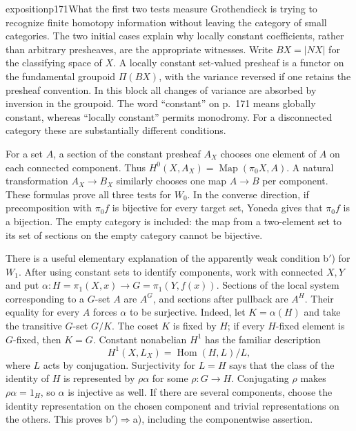 
\begin{dcomment}{exposition}{p171}{What the first two tests measure}
Grothendieck is trying to recognize finite homotopy information without leaving the category of small categories. The two initial cases explain why locally constant coefficients, rather than arbitrary presheaves, are the appropriate witnesses. Write $BX=|NX|$ for the classifying space of $X$. A locally constant set-valued presheaf is a functor on the fundamental groupoid $\Pi(BX)$, with the variance reversed if one retains the presheaf convention. In this block all changes of variance are absorbed by inversion in the groupoid. The word ``constant'' on p.~171 means globally constant, whereas ``locally constant'' permits monodromy. For a disconnected category these are substantially different conditions.

For a set $A$, a section of the constant presheaf $A_X$ chooses one element of $A$ on each connected component. Thus $H^0(X,A_X)=\operatorname{Map}(\pi_0X,A)$. A natural transformation $A_X\to B_X$ similarly chooses one map $A\to B$ per component. These formulas prove all three tests for $W_0$. In the converse direction, if precomposition with $\pi_0f$ is bijective for every target set, Yoneda gives that $\pi_0f$ is a bijection. The empty category is included: the map from a two-element set to its set of sections on the empty category cannot be bijective.

There is a useful elementary explanation of the apparently weak condition b$'$) for $W_1$. After using constant sets to identify components, work with connected $X,Y$ and put $\alpha:H=\pi_1(X,x)\to G=\pi_1(Y,f(x))$. Sections of the local system corresponding to a $G$-set $A$ are $A^G$, and sections after pullback are $A^H$. Their equality for every $A$ forces $\alpha$ to be surjective. Indeed, let $K=\alpha(H)$ and take the transitive $G$-set $G/K$. The coset $K$ is fixed by $H$; if every $H$-fixed element is $G$-fixed, then $K=G$. Constant nonabelian $H^1$ has the familiar description
\[
 H^1(X,L_X)=\operatorname{Hom}(H,L)/L,
\]
where $L$ acts by conjugation. Surjectivity for $L=H$ says that the class of the identity of $H$ is represented by $\rho\alpha$ for some $\rho:G\to H$. Conjugating $\rho$ makes $\rho\alpha=1_H$, so $\alpha$ is injective as well. If there are several components, choose the identity representation on the chosen component and trivial representations on the others. This proves b$'$)$\Rightarrow$a), including the componentwise assertion.


\end{dcomment}
